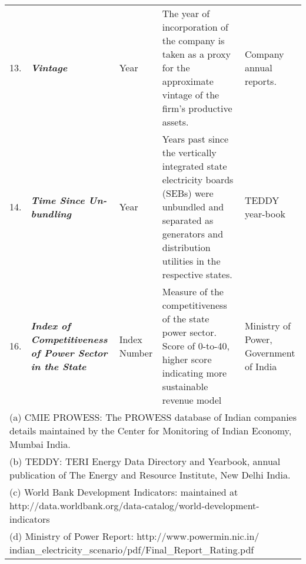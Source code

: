 \begin{sidewaystable}[htbp]
{\begin{tabular}{lp{}p{}p{}p{}}
    13. & \emph{\textbf{Vintage}} & Year & The year of incorporation of the company is taken as a proxy for the approximate vintage of the firm's productive assets. & Company annual reports. \\
    14. & \emph{\textbf{Time Since Un-bundling}} & Year & Years past since the vertically integrated state electricity boards (SEBs) were unbundled and separated as generators and distribution utilities in the respective states. & TEDDY year-book \\
    16. & \emph{\textbf{Index of Competitiveness of Power Sector in the State}} & Index Number &Measure of the competitiveness of the state power sector. Score of 0-to-40, higher score indicating more sustainable revenue model & Ministry of Power, Government of India \\
    \bottomrule
    \multicolumn{5}{l}{(a) CMIE PROWESS: The PROWESS database of Indian companies details maintained by the Center for Monitoring of Indian Economy, Mumbai India.}\\
    \multicolumn{5}{l}{(b) TEDDY: TERI Energy Data Directory and Yearbook, annual publication of The Energy and Resource Institute, New Delhi India.  }\\
    \multicolumn{5}{l}{(c) World Bank Development Indicators: maintained at http://data.worldbank.org/data-catalog/world-development-indicators}\\
    \multicolumn{5}{l}{(d) Ministry of Power Report: http://www.powermin.nic.in/ indian\_electricity\_scenario/pdf/Final\_Report\_Rating.pdf}
    \end{tabular}%
} %
\end{sidewaystable}%


